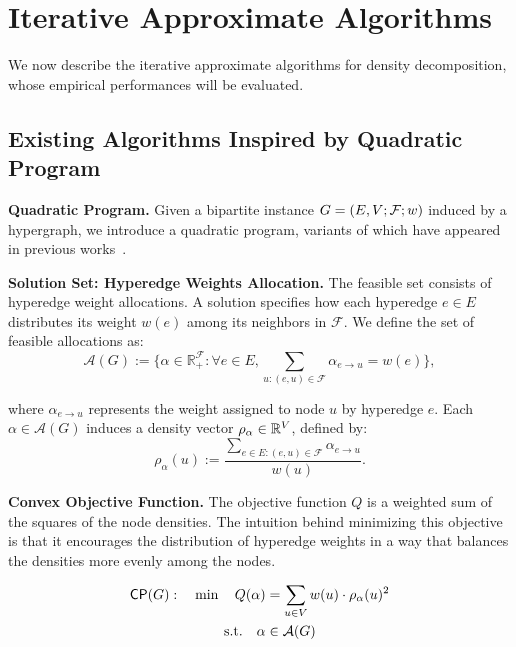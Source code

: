 \section{Iterative Approximate Algorithms}
\label{sec:approx}


We now describe the iterative approximate algorithms for density decomposition, whose empirical performances will be evaluated.


\subsection{Existing Algorithms Inspired by Quadratic Program}

\noindent \textbf{Quadratic Program.}
Given a bipartite instance $G = (E, V; \mathcal {F}; w)$ induced by a hypergraph, we introduce a quadratic program, variants of which have appeared in previous works~\cite{fujishige1980lexicographically,DBLP:conf/www/DanischCS17,DBLP:conf/nips/HarbQC22}.



\noindent \textbf{Solution Set: Hyperedge Weights Allocation.}
The feasible set consists of hyperedge weight allocations. 
A solution specifies how each hyperedge $e \in E$ distributes its weight $w(e)$ among its neighbors in $\mathcal{F}$. We define the set of feasible allocations as:
$$\mathcal{A}(G) := \{\alpha \in \mathbb{R}^{\mathcal{F}}_+ : \forall e \in E, \sum_{u:(e,u) \in \mathcal{F}} \alpha_{e\to u} = w(e)\},$$

where $\alpha_{e \to u}$ represents the weight assigned to node $u$ by hyperedge $e$. Each $\alpha \in \mathcal{A}(G)$ induces a density vector $\rho_\alpha \in \mathbb{R}^V$, defined by: 
$$\rho_\alpha(u) := \frac{\sum_{e \in E: (e,u) \in \mathcal{F}} \alpha_{e\to u}}{w(u)}.$$



\noindent \textbf{Convex Objective Function.}
The objective function $Q$ is a weighted sum of the squares of the node densities. The intuition behind minimizing this objective is that it encourages the distribution of hyperedge weights in a way that balances the densities more evenly among the nodes.





\begin{align*}
	\mathsf{CP}(G): \quad \min \quad  Q(\alpha) & = \sum_{u \in V} w(u) \cdot \rho_\alpha(u)^2\\
	\text{s.t.} %
	\quad \alpha & \in \mcal{A}(G) \\
\end{align*}



